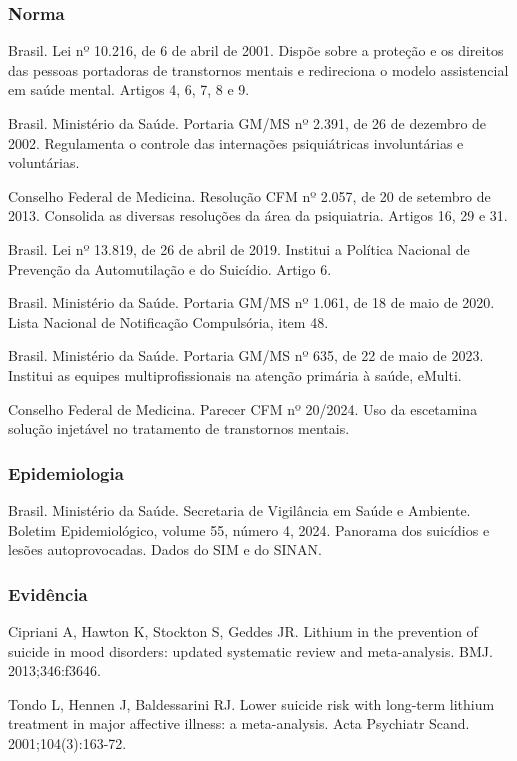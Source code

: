 \subsubsection*{Norma}

Brasil. Lei nº 10.216, de 6 de abril de 2001. Dispõe sobre a proteção e os direitos das pessoas portadoras de transtornos mentais e redireciona o modelo assistencial em saúde mental. Artigos 4, 6, 7, 8 e 9.

Brasil. Ministério da Saúde. Portaria GM/MS nº 2.391, de 26 de dezembro de 2002. Regulamenta o controle das internações psiquiátricas involuntárias e voluntárias.

Conselho Federal de Medicina. Resolução CFM nº 2.057, de 20 de setembro de 2013. Consolida as diversas resoluções da área da psiquiatria. Artigos 16, 29 e 31.

Brasil. Lei nº 13.819, de 26 de abril de 2019. Institui a Política Nacional de Prevenção da Automutilação e do Suicídio. Artigo 6.

Brasil. Ministério da Saúde. Portaria GM/MS nº 1.061, de 18 de maio de 2020. Lista Nacional de Notificação Compulsória, item 48.

Brasil. Ministério da Saúde. Portaria GM/MS nº 635, de 22 de maio de 2023. Institui as equipes multiprofissionais na atenção primária à saúde, eMulti.

Conselho Federal de Medicina. Parecer CFM nº 20/2024. Uso da escetamina solução injetável no tratamento de transtornos mentais.

\subsubsection*{Epidemiologia}

Brasil. Ministério da Saúde. Secretaria de Vigilância em Saúde e Ambiente. Boletim Epidemiológico, volume 55, número 4, 2024. Panorama dos suicídios e lesões autoprovocadas. Dados do SIM e do SINAN.

\subsubsection*{Evidência}

Cipriani A, Hawton K, Stockton S, Geddes JR. Lithium in the prevention of suicide in mood disorders: updated systematic review and meta-analysis. BMJ. 2013;346:f3646.

Tondo L, Hennen J, Baldessarini RJ. Lower suicide risk with long-term lithium treatment in major affective illness: a meta-analysis. Acta Psychiatr Scand. 2001;104(3):163-72.

